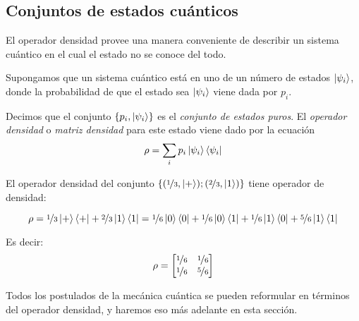 \subsection{Conjuntos de estados cuánticos}
El operador densidad provee una manera conveniente de describir un sistema
cuántico en el cual el estado no se conoce del todo.

\begin{definicion}
   Supongamos que un sistema cuántico está en uno de
  un número de estados $\ket{\psi_i}$, donde la probabilidad de que el estado
  sea $\ket{\psi_i}$ viene dada por $p_i$.

  Decimos que el conjunto $\{p_i,\ket{\psi_i}\}$ es el \emph{conjunto de estados
    puros}. El \emph{operador densidad} o \emph{matriz densidad} para este
  estado viene dado por la ecuación
  \[
    \rho = \sum_i p_i\ket{\psi_i}\bra{\psi_i}
  \]
\end{definicion}
\begin{ejemplo}
  \label{ex:OpDens}
  El operador densidad del conjunto $\{(\nicefrac 13,\ket+);(\nicefrac 23,\ket 1)\}$ tiene operador de densidad:
  
  \begin{equation*}
    \rho=\nicefrac 13\ket +\bra ++\nicefrac 23\ket 1\bra 1 = \nicefrac 16\ket
    0\bra 0+\nicefrac 16\ket 0\bra 1+\nicefrac 16\ket 1\bra 0+\nicefrac 56\ket
    1\bra 1
  \end{equation*}

  
  Es decir:
  \[
    \rho = \begin{bmatrix}\nicefrac 16 & \nicefrac 16\\\nicefrac 16 &\nicefrac 56\end{bmatrix}
  \]
\end{ejemplo}

\begin{observacion}
  Todos los postulados de la mecánica cuántica se pueden reformular en términos
  del operador densidad, y haremos eso más adelante en esta sección.
\end{observacion}

